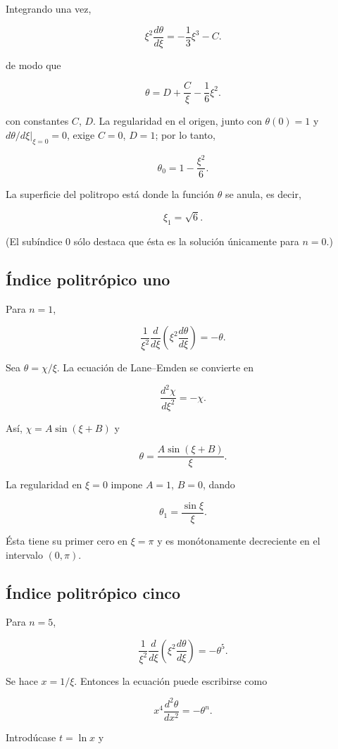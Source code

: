Integrando una vez,

$$ \xi^2\frac{d\theta}{d\xi} = -\frac{1}{3}\xi^3 - C. $$

de modo que

$$ \theta = D + \frac{C}{\xi} - \frac{1}{6}\xi^2. $$

con constantes $C$, $D$. La regularidad en el origen, junto con $\theta(0) = 1$ y $\left.d\theta/d\xi\right|_{\xi=0} = 0$, exige $C = 0$, $D = 1$; por lo tanto,

$$ \theta_0 = 1 - \frac{\xi^2}{6}. $$

La superficie del politropo está donde la función $\theta$ se anula, es decir,

$$ \xi_1 = \sqrt{6}. $$

(El subíndice $0$ sólo destaca que ésta es la solución únicamente para $n = 0$.)

\subsection{Índice politrópico uno}

Para $n = 1$,

$$ \frac{1}{\xi^2}\frac{d}{d\xi}\left(\xi^2\frac{d\theta}{d\xi}\right) = -\theta. $$

Sea $\theta = \chi/\xi$. La ecuación de Lane--Emden se convierte en

$$ \frac{d^2\chi}{d\xi^2} = -\chi. $$

Así, $\chi = A\sin(\xi + B)$ y

$$ \theta = \frac{A\sin(\xi + B)}{\xi}. $$

La regularidad en $\xi = 0$ impone $A = 1$, $B = 0$, dando

$$ \theta_1 = \frac{\sin\xi}{\xi}. $$

Ésta tiene su primer cero en $\xi = \pi$ y es monótonamente decreciente en el intervalo $(0, \pi)$.

\subsection{Índice politrópico cinco}

Para $n = 5$,

$$ \frac{1}{\xi^2}\frac{d}{d\xi}\left(\xi^2\frac{d\theta}{d\xi}\right) = -\theta^5. $$

Se hace $x = 1/\xi$. Entonces la ecuación puede escribirse como

$$ x^4\frac{d^2\theta}{dx^2} = -\theta^n. $$

Introdúcase $t = \ln x$ y

